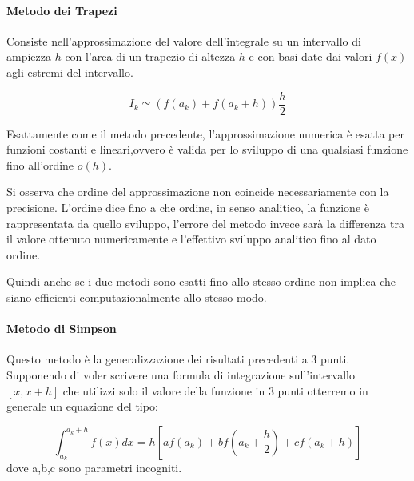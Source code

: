 \documentclass{article}
\begin{document}
\paragraph{Metodo dei Trapezi}

Consiste nell'approssimazione del valore dell'integrale su un intervallo di ampiezza $h$ con l'area di un trapezio di altezza $h$ e con basi date dai valori $f(x)$ agli estremi del intervallo.

	\begin{equation}
	I_{k}\simeq (f(a_{k})+f(a_{k}+h))\frac{h}{2}
	\end{equation}

Esattamente come il metodo precedente, l'approssimazione numerica è esatta per funzioni costanti e lineari,ovvero è valida per lo sviluppo di una qualsiasi funzione fino all'ordine $o(h)$.

Si osserva che ordine del approssimazione non coincide necessariamente con la precisione. L'ordine dice fino a che ordine, in senso analitico, la funzione è rappresentata da quello sviluppo, l'errore del metodo invece sarà la differenza tra il valore ottenuto numericamente e l'effettivo sviluppo analitico fino al dato ordine.

Quindi anche se i due metodi sono esatti fino allo stesso ordine non implica che siano efficienti computazionalmente allo stesso modo.

\paragraph{Metodo di Simpson}

Questo metodo è la generalizzazione dei risultati precedenti a 3 punti.
Supponendo di voler scrivere una formula di integrazione sull'intervallo $[x,x+h]$ che utilizzi solo il valore della funzione in 3 punti otterremo in generale un equazione del tipo:
	
\begin{equation}
	\int_{a_{k}}^{a_{k}+h}f(x)dx= h[af(a_{k})+bf(a_{k}+\frac{h}{2})+cf(a_{k}+h)]
	\end{equation}
dove a,b,c sono parametri incogniti.
\end{document}
